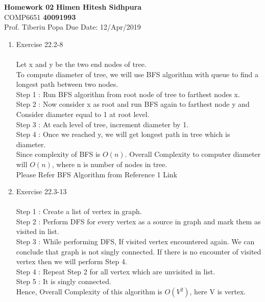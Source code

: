 \documentclass{article}
\begin{document}
\noindent
\large\textbf{Homework 02} \hfill \textbf{Himen Hitesh Sidhpura} \\
\normalsize COMP6651 \hfill \textbf{40091993} \\
Prof. Tiberiu Popa \hfill Due Date: 12/Apr/2019 \\

\begin{enumerate}
    \item Exercise 22.2-8  \\ \\
    Let x and  y be the two end nodes of tree.\\
    To compute diameter of tree, we will use BFS algorithm with queue to find a  longest path between two nodes.\\
    Step 1 : Run BFS algorithm from root node of tree to farthest nodes x. \\
    Step 2 : Now consider x as root and run BFS again to farthest node y and Consider diameter equal to 1 at root level.\\
    Step 3 : At each level of tree, increment diameter by 1.\\
    Step 4 : Once we reached y, we will get longest path in tree which is diameter. \\
    Since complexity of BFS is $O(n)$. Overall Complexity to computer diameter will $O(n)$, where n is number of nodes in  tree.\\
    
    Please Refer BFS Algorithm from Reference 1  Link \\
    
    
    \item Exercise 22.3-13\\ \\
    Step 1 : Create a list of vertex in graph.\\
    Step 2 : Perform DFS for every vertex as a source in graph and mark them as visited in list.\\
    Step 3 : While performing DFS, If visited vertex encountered again. We can conclude that graph is not singly connected. If there is no encounter of visited vertex then we will perform Step 4. \\
    Step 4 : Repeat Step 2 for all vertex which are unvisited in list.\\
    Step 5 : It is singly connected.\\
    
    Hence, Overall Complexity of this algorithm is $O(V^2)$, here V is vertex.\\
    

\end{enumerate}
\end{document}

